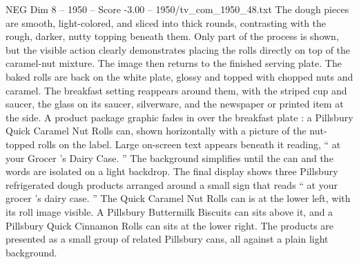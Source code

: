 \begin{textsample}{NEG Dim 8 – 1950 – Score -3.00 – 1950/tv\_com\_1950\_48.txt}
The dough pieces are smooth, light-colored, and sliced into thick rounds, contrasting with the rough, darker, nutty topping beneath them.
Only part of the process is shown, but the visible action clearly demonstrates placing the rolls directly on top of the caramel-nut mixture.
The image then returns to the finished serving plate.
The baked rolls are back on the white plate, glossy and topped with chopped nuts and caramel.
The breakfast setting reappears around them, with the striped cup and saucer, the glass on its saucer, silverware, and the newspaper or printed item at the side.
A product package graphic fades in over the breakfast plate : a Pillsbury Quick Caramel Nut Rolls can, shown horizontally with a picture of the nut-topped rolls on the label.
Large on-screen text appears beneath it reading, “ at your Grocer ’s Dairy Case. ” The background simplifies until the can and the words are isolated on a light backdrop.
The final display shows three Pillsbury refrigerated dough products arranged around a small sign that reads “ at your grocer ’s dairy case. ” The Quick Caramel Nut Rolls can is at the lower left, with its roll image visible.
A Pillsbury Buttermilk Biscuits can sits above it, and a Pillsbury Quick Cinnamon Rolls can sits at the lower right.
The products are presented as a small group of related Pillsbury cans, all against a plain light background.

\end{textsample}

